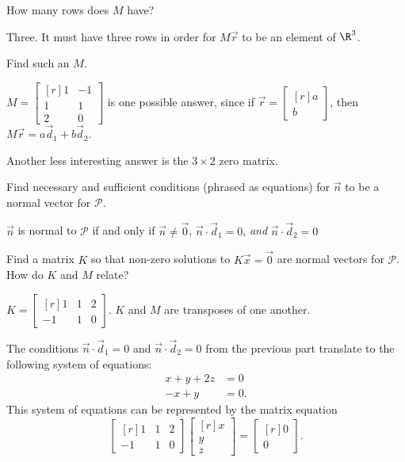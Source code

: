 \documentclass{problemset}
\newcommand{\mat}[1]{\begin{bmatrix*}[r]#1\end{bmatrix*}}
\begin{document}
	\begin{parts}
		\item How many rows does $M$ have?
			\begin{solution}
				Three. It must have three rows in order for $M\vec r$ to be an
				element of $\R^3$.
			\end{solution}
		\item Find such an $M$.
			\begin{solution}
				$M=\mat{1&-1\\1&1\\2&0}$ is one possible answer, since if
				$\vec r = \mat{a\\b}$, then $M \vec r = a \vec d_1 + b \vec d_2$.

				Another less interesting answer is the $3\times2$ zero matrix.
			\end{solution}
		\item Find necessary and sufficient conditions (phrased as equations) for
			$\vec n$ to be a normal vector for $\mathcal P$.
			\begin{solution}
				$\vec n$ is normal to $\mathcal P$ if and only if $\vec n\neq \vec 0$,
				$\vec n\cdot\vec d_1=0$, \emph{and} $\vec n\cdot\vec d_2=0$
			\end{solution}
		\item Find a matrix $K$ so that non-zero solutions to $K\vec x=\vec 0$ are normal
			vectors for $\mathcal P$. How do $K$ and $M$ relate?
			\begin{solution}
				$K = \mat{1&1&2\\-1&1&0}$. $K$ and $M$ are transposes of
				one another.

				The conditions $\vec n\cdot\vec d_1=0$ and $\vec n\cdot\vec d_2=0$
				from the previous part translate to the following system of equations:
				\begin{align*}
					x + y + 2z &= 0 \\
					-x + y &= 0.
				\end{align*}
				This system of equations can be represented by the matrix equation
				\[
					\mat{1&1&2\\-1&1&0}\mat{x\\y\\z} = \mat{0\\0}.
				\]
			\end{solution}
	\end{parts}
\end{document}
